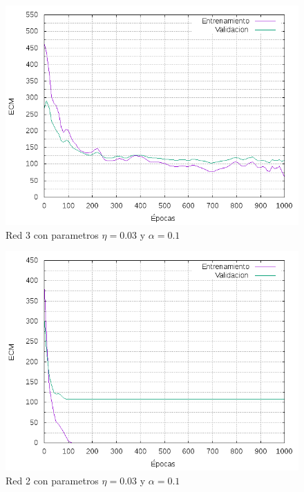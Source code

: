 \begin{figure}[h!]
  \includegraphics[width=125mm]{imagenes/ej1/ex_2-2_red_11-6-6-9-1_errors.png}
  \caption{Red 3 con parametros $\eta = 0.03$ y $\alpha = 0.1$}
\end{figure}

\begin{figure}[h!]
  \includegraphics[width=125mm]{imagenes/ej1/ex_2-2_red_11-21-1_errors.png}
  \caption{Red 2 con parametros $\eta = 0.03$ y $  \alpha = 0.1$}
\end{figure}

